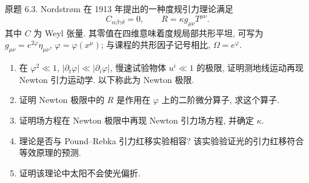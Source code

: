\begin{exercise}
原题 6.3. Nordstr\o m 在 1913 年提出的一种度规引力理论满足
\[
C_{\alpha\beta\gamma\delta}=0,\qquad R=\kappa g_{\mu\nu}T^{\mu\nu}.
\]
其中 $C$ 为 Weyl 张量. 其零值在四维意味着度规局部共形平坦, 可写为 $g_{\mu\nu}=e^{2\varphi}\eta_{\mu\nu}$, $\varphi=\varphi(x^\mu)$; 与课程的共形因子记号相比, $\Omega=e^\varphi$.
\begin{enumerate}[label=(\alph*)]
\item 在 $\varphi^2\ll1$, $|\partial_t\varphi|\ll|\partial_i\varphi|$, 慢速试验物体 $u^i\ll1$ 的极限, 证明测地线运动再现 Newton 引力运动学. 以下称此为 Newton 极限.
\item 证明 Newton 极限中的 $R$ 是作用在 $\varphi$ 上的二阶微分算子, 求这个算子.
\item 证明场方程在 Newton 极限中再现 Newton 引力场方程, 并确定 $\kappa$.
\item 理论是否与 Pound--Rebka 引力红移实验相容? 该实验验证光的引力红移符合等效原理的预测.
\item 证明该理论中太阳不会使光偏折.
\end{enumerate}
\end{exercise}
